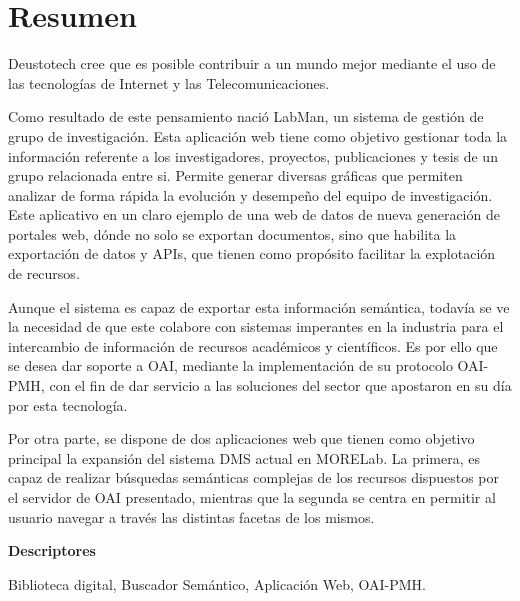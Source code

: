 \chapter*{Resumen}

Deustotech cree que es posible contribuir a un mundo mejor mediante el uso de
las tecnologías de Internet y las Telecomunicaciones.

Como resultado de este pensamiento nació LabMan, un sistema de gestión de grupo
de investigación. Esta aplicación web tiene como objetivo gestionar toda la
información referente a los investigadores, proyectos, publicaciones y tesis de un grupo relacionada entre si. Permite generar diversas gráficas que permiten analizar de forma rápida la evolución y desempeño del equipo de investigación.
Este aplicativo en un claro ejemplo de una web de datos de nueva generación de
portales web, dónde no solo se exportan documentos, sino que habilita la
exportación de datos y APIs, que tienen como propósito facilitar la explotación
de recursos.

Aunque el sistema es capaz de exportar esta información semántica, todavía se ve la necesidad de que este colabore con  sistemas imperantes en la industria para el intercambio de información de recursos académicos y científicos.
Es por ello que se desea dar soporte a OAI, mediante la implementación de su
protocolo OAI-PMH, con el fin de dar servicio a las soluciones del sector que
apostaron en su día por esta tecnología.

Por otra parte, se dispone de dos aplicaciones web que tienen como objetivo
principal la expansión del sistema DMS actual en MORELab. La primera, es capaz
de realizar búsquedas semánticas complejas de los recursos dispuestos por el
servidor de OAI presentado, mientras que la segunda se centra en permitir al
usuario navegar a través las distintas facetas de los mismos.

\vspace{2em}

{\Large\bfseries\sffamily Descriptores}
\vspace{3\medskipamount}

Biblioteca digital, Buscador Semántico, Aplicación Web, OAI-PMH.